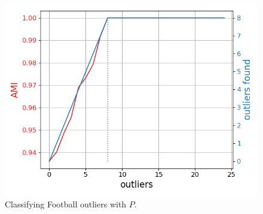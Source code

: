\documentclass{beamer}
\begin{document}
\begin{frame}{}
    \begin{figure}
        \includegraphics[height=0.8\textheight]{figures/foot2b.png}
        \caption{Classifying Football outliers with $P$.}
    \end{figure}
\end{frame}

\subtitle{Overlapping Communities}
\end{document}
